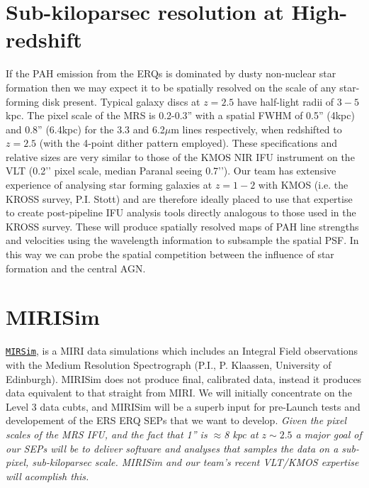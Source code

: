 \section*{Sub-kiloparsec resolution at High-redshift}
\vspace{-6pt}
If the PAH emission from the ERQs is dominated by dusty non-nuclear
star formation then we may expect it to be spatially resolved on the
scale of any star-forming disk present. Typical galaxy discs at $z=2.5$
have half-light radii of $3-5$kpc. The pixel scale of the MRS is 0.2-0.3''  
with a spatial FWHM of 0.5'' (4kpc) and 0.8'' (6.4kpc) for the 3.3 and 6.2$\mu$m lines
respectively, when redshifted to $z=2.5$ (with the 4-point dither
pattern employed). These specifications and relative sizes are very
similar to those of the KMOS NIR IFU instrument on the VLT (0.2’’
pixel scale, median Paranal seeing 0.7’’). Our team has extensive
experience of analysing star forming galaxies at $z=1-2$ with KMOS
(i.e. the KROSS survey, P.I. Stott) and are
therefore ideally placed to use that expertise to create post-pipeline
IFU analysis tools directly analogous to those used in the KROSS
survey. These will produce spatially resolved maps of PAH line
strengths and velocities using the wavelength information to subsample
the spatial PSF. In this way we can probe the spatial competition
between the influence of star formation and the central AGN.

\section*{MIRISim}
\vspace{-6pt}
\href{http://www.miricle.org/MIRICLE2/devel/doc/mirisim/User_Guide/index.html}
{\tt MIRSim}, is a MIRI data simulations which includes an Integral
Field observations with the Medium Resolution Spectrograph (P.I., P. Klaassen, 
University of Edinburgh).  MIRISim does not
produce final, calibrated data, instead it produces data equivalent to
that straight from MIRI. We will initially concentrate on the Level 3
data cubts, and MIRISim will be a superb input for pre-Launch tests
and developement of the ERS ERQ SEPs that we want to develop.  {\it
Given the pixel scales of the MRS IFU, and the fact that 1'' is
$\approx$8 kpc at $z\sim2.5$ a major goal of our SEPs will be to
deliver software and analyses that samples the data on a sub-pixel,
sub-kiloparsec scale.  MIRISim and our team's recent VLT/KMOS
expertise will acomplish this.}



